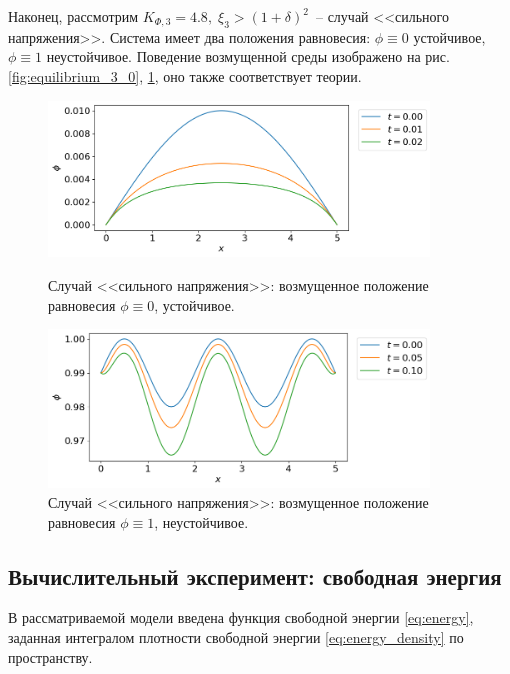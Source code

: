 Наконец, рассмотрим $K_{\Phi, 3} = 4.8, \; \xi_3 > (1 + \delta)^2$~-- случай <<сильного напряжения>>. Система имеет два положения равновесия: $\phi \equiv 0$ устойчивое, $\phi \equiv 1$ неустойчивое. Поведение возмущенной среды изображено на рис. \ref{fig:equilibrium_3_0}, \ref{fig:equilibrium_3_1}, оно также соответствует теории.

\begin{figure}[!t]
	\centering
	\includegraphics[width=0.9\textwidth]{figures/equilibrium_3_0.png}
	\vspace{-0.3cm}
	\caption{Случай <<сильного напряжения>>: возмущенное положение равновесия $\phi \equiv 0$, устойчивое.}
	\label{fig:equilibrium_3_0}
	\vspace{0.5cm}
	
	\includegraphics[width=0.9\textwidth]{figures/equilibrium_3_1.png}
	\vspace{-0.3cm}
	\caption{Случай <<сильного напряжения>>: возмущенное положение равновесия $\phi \equiv 1$, неустойчивое.}
	\label{fig:equilibrium_3_1}
\end{figure}


\subsection{Вычислительный эксперимент: свободная энергия}

В рассматриваемой модели введена функция свободной энергии \eqref{eq:energy}, заданная интегралом плотности свободной энергии \eqref{eq:energy_density} по пространству.

